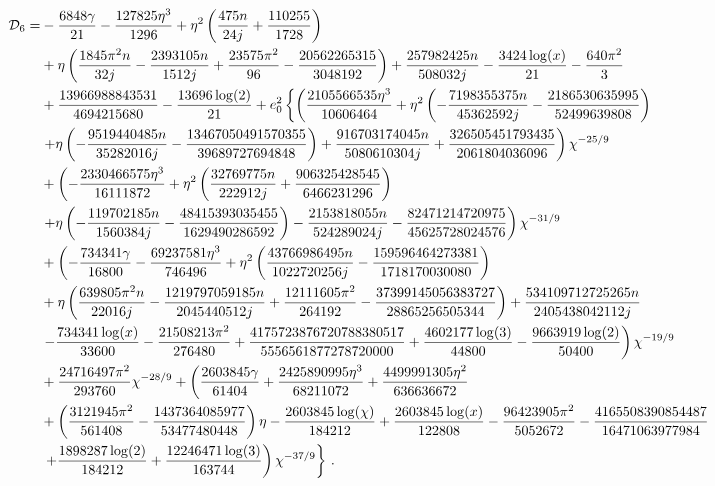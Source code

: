 \documentclass[aps,prd,twocolumn,superscriptaddress,groupedaddress,nofootinbib,showpacs,eqsecnum,useAms]{revtex4-2}
\begin{document}
\begin{widetext}
\begin{subequations}
\begin{align}
{\cal D}_6=& -\frac{6848 \gamma }{21}-\frac{127825 \eta ^3}{1296}+\eta ^2 \left(\frac{475 n}{24 j}+\frac{110255}{1728}\right) \notag \\
& + \eta  \left(\frac{1845 \pi ^2 n}{32 j}-\frac{2393105 n}{1512 j}+\frac{23575 \pi ^2}{96}-\frac{20562265315}{3048192}\right)+\frac{257982425 n}{508032 j}-\frac{3424 \log (x)}{21}-\frac{640 \pi ^2}{3} \notag \\
& +\frac{13966988843531}{4694215680}-\frac{13696 \log (2)}{21} + e_0^2 \left\{ \left(\frac{2105566535 \eta ^3}{10606464}+\eta ^2 \left(-\frac{7198355375 n}{45362592 j}-\frac{2186530635995}{52499639808}\right) \right. \right. \notag \\
&\left. +\eta  \left(-\frac{9519440485 n}{35282016 j}-\frac{13467050491570355}{39689727694848}\right)+\frac{916703174045 n}{5080610304 j}+\frac{326505451793435}{2061804036096}\right) \chi^{-25/9} \notag \\
& + \left(-\frac{2330466575 \eta ^3}{16111872}+\eta ^2 \left(\frac{32769775 n}{222912 j}+\frac{906325428545}{6466231296}\right) \right. \notag \\
&\left. +\eta  \left(-\frac{119702185 n}{1560384 j}-\frac{48415393035455}{1629490286592}\right)-\frac{2153818055 n}{524289024 j}-\frac{82471214720975}{45625728024576}\right) \chi^{-31/9} \notag \\
& + \left(-\frac{734341 \gamma }{16800}-\frac{69237581 \eta ^3}{746496}+\eta ^2 \left(\frac{43766986495 n}{1022720256 j}-\frac{159596464273381}{1718170030080}\right) \right. \notag \\
& +\eta  \left(\frac{639805 \pi ^2 n}{22016 j}-\frac{1219797059185 n}{2045440512 j}+\frac{12111605 \pi ^2}{264192}-\frac{37399145056383727}{28865256505344}\right)+\frac{534109712725265 n}{2405438042112 j} \notag \\
&\left. -\frac{734341 \log (x)}{33600}-\frac{21508213 \pi ^2}{276480}+\frac{4175723876720788380517}{5556561877278720000}+\frac{4602177 \log (3)}{44800}-\frac{9663919 \log (2)}{50400}\right) \chi^{-19/9} \notag \\
& +\frac{24716497 \pi ^2}{293760}\chi^{-28/9} + \left(\frac{2603845 \gamma }{61404}+\frac{2425890995 \eta ^3}{68211072}+\frac{4499991305 \eta ^2}{636636672} \right. \notag \\
& +\left(\frac{3121945 \pi ^2}{561408}-\frac{1437364085977}{53477480448}\right) \eta -\frac{2603845 \log (\chi )}{184212}+\frac{2603845 \log (x)}{122808}-\frac{96423905 \pi ^2}{5052672}-\frac{4165508390854487}{16471063977984} \notag \\
&\left. \left. +\frac{1898287 \log (2)}{184212}+\frac{12246471 \log (3)}{163744}\right) \chi^{-37/9} \right\}\,.
\end{align}
\end{subequations}
\end{widetext}
\end{document}
